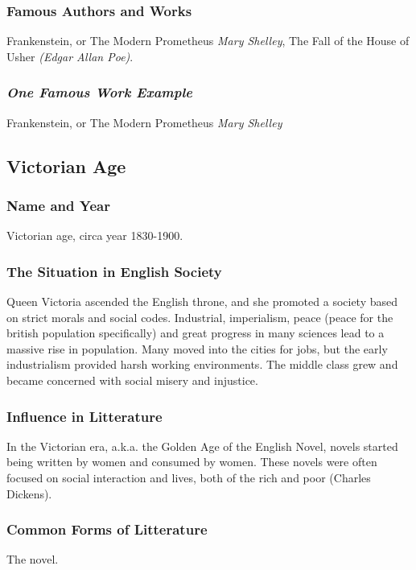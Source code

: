 \subsubsection{Famous Authors and Works}
Frankenstein, or The Modern Prometheus \textit{Mary Shelley}, The Fall of the House of Usher \textit{(Edgar Allan Poe)}.


\subsubsection{\textit{One Famous Work Example}}
Frankenstein, or The Modern Prometheus \textit{Mary Shelley}

\newpage
\subsection{Victorian Age}

\subsubsection{Name and Year}
Victorian age, circa year 1830-1900.

\subsubsection{The Situation in English Society}
Queen Victoria ascended the English throne, and she promoted a society based on strict morals and social codes. Industrial, imperialism, peace (peace for the british population specifically) and great progress in many sciences lead to a massive rise in population. Many moved into the cities for jobs, but the early industrialism provided harsh working environments. The middle class grew and became concerned with social misery and injustice.

\subsubsection{Influence in Litterature}
In the Victorian era, a.k.a. the Golden Age of the English Novel, novels started being written by women and consumed by women. These novels were often focused on social interaction and lives, both of the rich and poor (Charles Dickens).

\subsubsection{Common Forms of Litterature}
The novel.

